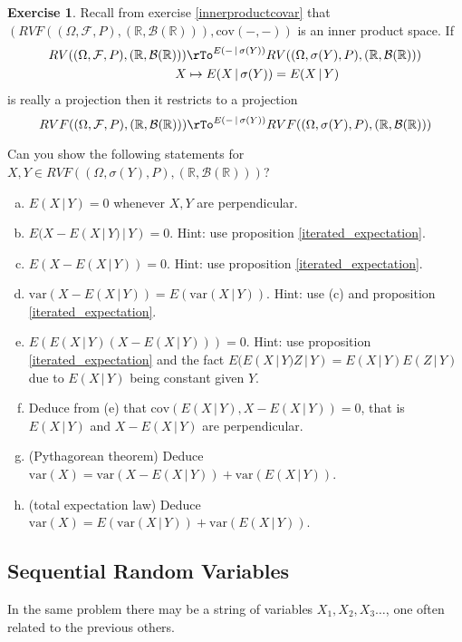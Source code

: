 \documentclass[12pt]{amsart}
\theoremstyle{definition}
\newtheorem{exercise}[theorem]{Exercise}
\begin{document}
\begin{exercise} \label{geometry_of_conditional_expectation} Recall from exercise \ref{innerproductcovar} that $(RVF((\Omega, \mathcal{F}, P), (\mathbb{R}, \mathcal{B}(\mathbb{R}))), \text{cov}(- , -))$ is an inner product space. If
\begin{align*}
RV((\Omega, \mathcal{F}, P), (\mathbb{R}, \mathcal{B}(\mathbb{R}))) & \rTo^{E( - \,|\, \sigma(Y))} RV((\Omega, \sigma(Y), P), (\mathbb{R}, \mathcal{B}(\mathbb{R}))) \\
X & \mapsto E(X \,|\, \sigma(Y)) = E(X \,|\, Y)
\end{align*}
is really a projection then it restricts to a projection
$$RVF((\Omega, \mathcal{F}, P), (\mathbb{R}, \mathcal{B}(\mathbb{R}))) \rTo^{E( - \,|\, \sigma(Y))} RVF((\Omega, \sigma(Y), P), (\mathbb{R}, \mathcal{B}(\mathbb{R})))$$

Can you show the following statements for $X, Y \in RVF((\Omega, \sigma(Y), P), (\mathbb{R}, \mathcal{B}(\mathbb{R})))$?
\begin{enumerate}[a.]
\item $E(X \,|\, Y) = 0$ whenever $X, Y$ are perpendicular.
\item $E(X - E(X \,|\, Y) \,|\, Y) = 0$. Hint: use proposition \ref{iterated_expectation}.
\item $E(X - E(X \,|\, Y)) = 0$. Hint: use proposition \ref{iterated_expectation}.
\item $\text{var}(X - E(X \,|\, Y)) = E(\text{var}(X \,|\, Y))$. Hint: use (c) and proposition \ref{iterated_expectation}.
\item $E(E(X \,|\, Y)(X - E(X \,|\, Y))) = 0$. Hint: use proposition \ref{iterated_expectation} and the fact $E(E(X \,|\, Y)Z \,|\, Y) = E(X \,|\, Y)E(Z \,|\, Y)$ due to $E(X \,|\, Y)$ being constant given $Y$.
\item Deduce from (e) that $\text{cov}(E(X \,|\, Y), X - E(X \,|\, Y)) = 0$, that is $E(X \,|\, Y)$ and $X - E(X \,|\, Y)$ are perpendicular.
\item (Pythagorean theorem) Deduce $\text{var}(X) = \text{var}(X - E(X \,|\, Y)) + \text{var}(E(X \,|\, Y))$.
\item (total expectation law) Deduce $\text{var}(X) = E(\text{var}(X \,|\, Y)) + \text{var}(E(X \,|\, Y))$.
\end{enumerate}
\end{exercise}

\subsection{Sequential Random Variables} In the same problem there may be a string of variables $X_1, X_2, X_3 \dots$, one often related to the previous others.
\end{document}
